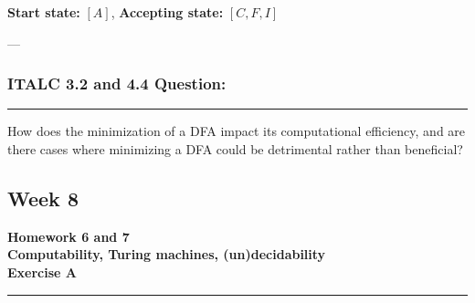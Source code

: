 \documentclass{article}
\theoremstyle{theorem}
\theoremstyle{definition}
\theoremstyle{remark}
\begin{document}
\textbf{Start state:} \( [A] \), \quad \textbf{Accepting state:} \( [C, F, I] \)

---

\subsubsection*{ITALC 3.2 and 4.4 Question:}

\vspace{0.5em}
\hrule
\vspace{0.5em}

How does the minimization of a DFA impact its computational efficiency, and are there cases where minimizing a DFA could be detrimental rather than beneficial?


\subsection{Week 8}
\textbf{Homework 6 and 7}\\
\textbf {Computability, Turing machines, (un)decidability}\\
\textbf{Exercise A}
\vspace{0.5em}
\hrule
\vspace{0.5em}
\end{document}
